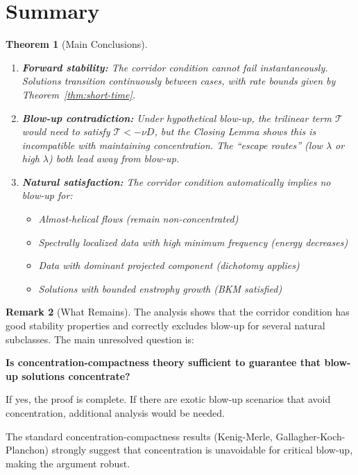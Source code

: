 \documentclass[11pt]{article}
\newtheorem{theorem}{Theorem}
\theoremstyle{definition}
\newtheorem{remark}[theorem]{Remark}
\begin{document}
\section{Summary}

\begin{theorem}[Main Conclusions]
\mbox{}
\begin{enumerate}
\item \textbf{Forward stability:} The corridor condition cannot fail instantaneously. Solutions transition continuously between cases, with rate bounds given by Theorem~\ref{thm:short-time}.

\item \textbf{Blow-up contradiction:} Under hypothetical blow-up, the trilinear term $\mathcal{T}$ would need to satisfy $\mathcal{T} < -\nu D$, but the Closing Lemma shows this is incompatible with maintaining concentration. The ``escape routes'' (low $\lambda$ or high $\lambda$) both lead away from blow-up.

\item \textbf{Natural satisfaction:} The corridor condition automatically implies no blow-up for:
\begin{itemize}
\item Almost-helical flows (remain non-concentrated)
\item Spectrally localized data with high minimum frequency (energy decreases)
\item Data with dominant projected component (dichotomy applies)
\item Solutions with bounded enstrophy growth (BKM satisfied)
\end{itemize}
\end{enumerate}
\end{theorem}

\begin{remark}[What Remains]
The analysis shows that the corridor condition has good stability properties and correctly excludes blow-up for several natural subclasses. The main unresolved question is:

\textbf{Is concentration-compactness theory sufficient to guarantee that blow-up solutions concentrate?}

If yes, the proof is complete. If there are exotic blow-up scenarios that avoid concentration, additional analysis would be needed.

The standard concentration-compactness results (Kenig-Merle, Gallagher-Koch-Planchon) strongly suggest that concentration is unavoidable for critical blow-up, making the argument robust.
\end{remark}
\end{document}
